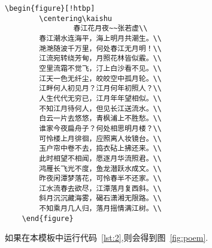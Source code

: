 \documentclass[timesfont,no-math]{JXUSTmodeling}%
\begin{document}
	\begin{figure*}[!htbp]
		\centering
		\begin{lstlisting}[language={[LaTeX]TeX},caption={\LaTeX{} 代码},label={lst:2}]
	\begin{figure}[!htbp]
		\centering\kaishu
				春江花月夜~~张若虚\\
		春江潮水连海平，海上明月共潮生。\\
		滟滟随波千万里，何处春江无月明！\\
		江流宛转绕芳甸，月照花林皆似霰。\\
		空里流霜不觉飞，汀上白沙看不见。\\
		江天一色无纤尘，皎皎空中孤月轮。\\
		江畔何人初见月？江月何年初照人？\\
		人生代代无穷已，江月年年望相似。\\
		不知江月待何人，但见长江送流水。\\
		白云一片去悠悠，青枫浦上不胜愁。\\
		谁家今夜扁舟子？何处相思明月楼？\\
		可怜楼上月徘徊，应照离人妆镜台。\\
		玉户帘中卷不去，捣衣砧上拂还来。\\
		此时相望不相闻，愿逐月华流照君。\\
		鸿雁长飞光不度，鱼龙潜跃水成文。\\
		昨夜闲潭梦落花，可怜春半不还家。\\
		江水流春去欲尽，江潭落月复西斜。\\
		斜月沉沉藏海雾，碣石潇湘无限路。\\
		不知乘月几人归，落月摇情满江树。\\
	\end{figure}
		\end{lstlisting}
		如果在本模板中运行代码~\ref{lst:2},则会得到图~\ref{fig:poem}.
	\end{figure*}
	
\end{document}
